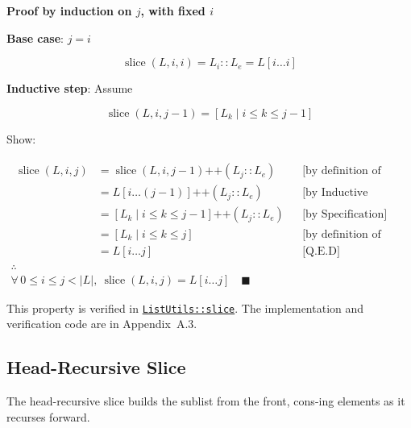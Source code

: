 \textbf{Proof by induction on $j$, with fixed $i$}\par\nopagebreak

\textbf{Base case}: $j = i$\par\nopagebreak

\begin{equation*}
\operatorname{slice}(L, i, i) = L_i :: L_e = L[i \dots i]
\end{equation*}

\textbf{Inductive step}: Assume\par\nopagebreak

\begin{equation*}
\operatorname{slice}(L, i, j - 1) = [ L_k \mid i \leq k \leq j - 1 ]
\end{equation*}

Show:\par\nopagebreak

\begin{gather*}
\begin{aligned}
\operatorname{slice}(L, i, j) &= \operatorname{slice}(L, i, j - 1) \mathbin{\texttt{++}} (L_j :: L_e) && \text{[by definition of slice]} \\
&= L[i \dots (j - 1)] \mathbin{\texttt{++}} (L_j :: L_e) && \text{[by Inductive Hypothesis]} \\
&= [ L_k \mid i \leq k \leq j - 1 ] \mathbin{\texttt{++}} (L_j :: L_e) && \text{[by Specification]} \\
&= [ L_k \mid i \leq k \leq j ] && \text{[by definition of Concatenation]} \\
&= L[i \dots j] && \text{[Q.E.D]}
\end{aligned} \\
\therefore \\
\forall\, 0 \leq i \leq j < |L|,\ \operatorname{slice}(L, i, j) = L[i \dots j]
\quad \blacksquare
\end{gather*}

This property is verified in
\href{https://github.com/thiagomata/prime-numbers/blob/list-article-v1.0.0/src/main/scala/v1/chapter3/list/ListUtils.scala}{\texttt{ListUtils::slice}}.
The implementation and verification code are in Appendix~A.3.

\subsection{Head-Recursive Slice}

The head-recursive slice builds the sublist from the front, cons-ing
elements as it recurses forward.

